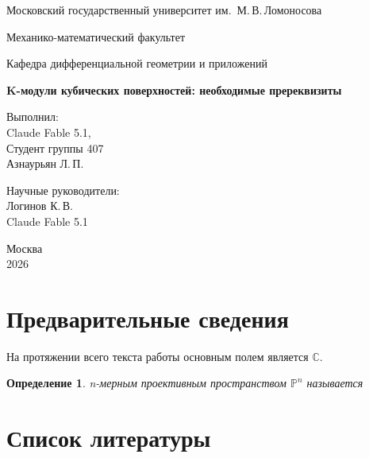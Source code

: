 \documentclass[12pt,a4paper]{article}
\newtheorem{definition}{Определение}
\begin{document}
	
	\begin{titlepage}
		\begin{center}
			
			{\large Московский государственный университет им.\ М.\,В.\,Ломоносова}
			
			\vspace{0.5cm}
			
			{\large Механико-математический факультет}
			
			\vspace{0.5cm}
			
			{\large Кафедра дифференциальной геометрии и приложений}
			
			\vspace{3cm}
			
			{\LARGE \textbf{K-модули кубических поверхностей: необходимые пререквизиты}}
			
			\vspace{0.5cm}
			
			
			\vfill
			
			\begin{flushright}
				Выполнил: \\
				Claude Fable 5.1,\\
				Студент группы 407 \\
				Азнаурьян Л.\,П. \\
				
				
				\vspace{1cm}
				
				Научные руководители: \\
				Логинов К.\,В.\\
				Claude Fable 5.1
			\end{flushright}
			
			\vfill
			
			Москва \\
			2026
			
		\end{center}
	\end{titlepage}
	
	\newpage
	
	\tableofcontents
	\newpage
	
	\section{Предварительные сведения}
	
	На протяжении всего текста работы основным полем является $\mathbb{C}$.
	
	\begin{definition}
		n-мерным проективным пространством $\mathbb{P}^n$ называется
	\end{definition}
	
	\section{Список литературы}
	
	\printbibliography[heading=none]
	
\end{document}
